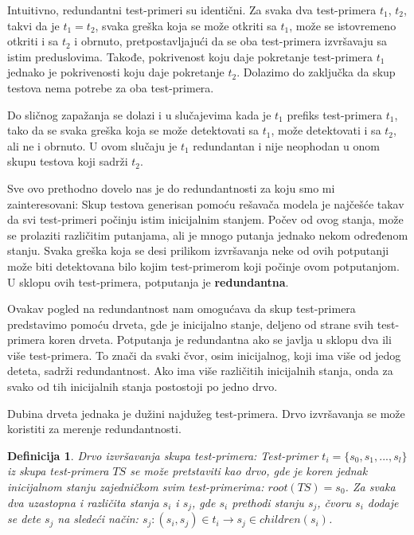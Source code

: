 \documentclass[a4paper]{article}
\newtheorem{definition}{Definicija}[section]
\begin{document}
Intuitivno, redundantni test-primeri su identični. Za svaka dva test-primera $t_1$, $t_2$, takvi da je $ t_1 = t_2$, svaka greška koja se može otkriti sa $t_1$, može se istovremeno otkriti i sa $t_2$ i obrnuto, pretpostavljajući da se oba test-primera izvršavaju sa istim preduslovima. Takođe, pokrivenost koju daje pokretanje test-primera $t_1$ jednako je pokrivenosti koju daje pokretanje $t_2$. Dolazimo do zaključka da skup testova nema potrebe za oba test-primera.

Do sličnog zapažanja se dolazi i u slučajevima kada je $t_1$ prefiks test-primera $t_1$, tako da se svaka greška koja se može detektovati sa $t_1$, može detektovati i sa $t_2$, ali ne i obrnuto. U ovom slučaju je $t_1$ redundantan i nije neophodan u onom skupu testova koji sadrži $t_2$.

Sve ovo prethodno dovelo nas je do redundantnosti za koju smo mi zainteresovani: Skup testova generisan pomoću rešavača modela je najčešće takav da svi test-primeri počinju istim inicijalnim stanjem. Počev od ovog stanja, može se prolaziti različitim putanjama, ali je mnogo putanja jednako nekom određenom stanju. 
Svaka greška koja se desi prilikom izvršavanja neke od ovih potputanji može biti detektovana bilo kojim test-primerom koji počinje ovom potputanjom. U sklopu ovih test-primera, potputanja je \textbf{redundantna}.

Ovakav pogled na redundantnost nam omogućava da skup test-primera predstavimo pomoću drveta, gde je inicijalno stanje, deljeno od strane svih test-primera koren drveta. Potputanja je redundantna ako se javlja u sklopu dva ili više test-primera. To znači da svaki čvor, osim inicijalnog, koji ima više od jedog deteta, sadrži redundantnost. Ako ima više različitih inicijalnih stanja, onda za svako od tih inicijalnih stanja postostoji po jedno drvo.

Dubina drveta jednaka je dužini najdužeg test-primera. Drvo izvršavanja se može koristiti za merenje redundantnosti.

\begin{definition}{Drvo izvršavanja skupa test-primera:}
Test-primer $t_i = \{s_0, s_1, ..., s_l\}$ iz skupa test-primera $TS$ se može pretstaviti kao drvo, gde je koren jednak inicijalnom stanju zajedničkom svim test-primerima: $root(TS) = s_0$. Za svaka dva uzastopna i različita stanja $s_i$ i $s_j$, gde $s_i$ prethodi stanju $s_j$, čvoru $s_i$ dodaje se dete $s_j$ na sledeći način: $s_j: (s_i, s_j) \in t_i \rightarrow s_j \in children(s_i)$.
\end{definition}
\end{document}

